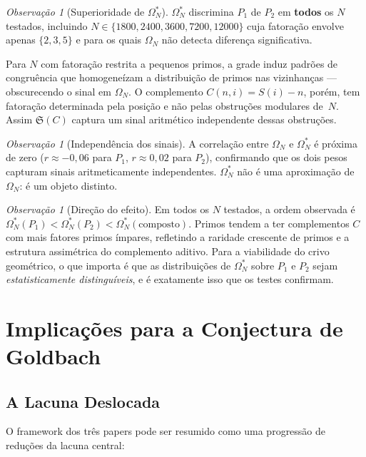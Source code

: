 \documentclass[12pt,a4paper]{article}
\theoremstyle{definition}
\theoremstyle{remark}
\newtheorem{remark}[theorem]{Observação}
\newcommand{\Om}{\Omega_N}           %
\newcommand{\Oms}{\Omega^*_N}        %
\newcommand{\Ss}{\mathfrak{S}}       %
\begin{document}
	\begin{remark}[Superioridade de $\Oms$]
		\label{rem:superior}
		$\Oms$ discrimina $P_1$ de $P_2$ em \textbf{todos} os $N$ testados,
		incluindo $N\in\{1800,2400,3600,7200,12000\}$ cuja fatoração envolve apenas
		$\{2,3,5\}$ e para os quais $\Om$ não detecta diferença significativa.
	\end{remark}
	
	Para $N$ com fatoração restrita a pequenos primos, a grade induz padrões de
	congruência que homogeneízam a distribuição de primos nas vizinhanças ---
	obscurecendo o sinal em $\Om$.
	O complemento $C(n,i)=S(i)-n$, porém, tem fatoração determinada pela
	posição e não pelas obstruções modulares de~$N$.
	Assim $\Ss(C)$ captura um sinal aritmético independente dessas obstruções.
	
	\begin{remark}[Independência dos sinais]
		A correlação entre $\Om$ e $\Oms$ é próxima de zero
		($r\approx-0{,}06$ para $P_1$, $r\approx0{,}02$ para $P_2$),
		confirmando que os dois pesos capturam sinais aritmeticamente independentes.
		$\Oms$ não é uma aproximação de $\Om$: é um objeto distinto.
	\end{remark}
	
	\begin{remark}[Direção do efeito]
		Em todos os $N$ testados, a ordem observada é
		$\Oms(P_1)<\Oms(P_2)<\Oms(\text{composto})$.
		Primos tendem a ter complementos $C$ com mais fatores primos ímpares,
		refletindo a raridade crescente de primos e a estrutura assimétrica do
		complemento aditivo.
		Para a viabilidade do crivo geométrico, o que importa é que as distribuições
		de $\Oms$ sobre $P_1$ e $P_2$ sejam \emph{estatisticamente distinguíveis},
		e é exatamente isso que os testes confirmam.
	\end{remark}
	
	\section{Implicações para a Conjectura de Goldbach}
	
	\subsection{A Lacuna Deslocada}
	
	O framework dos três papers pode ser resumido como uma progressão de
	reduções da lacuna central:
	
\end{document}
